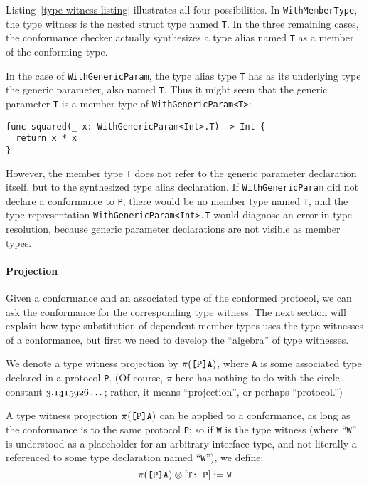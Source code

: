 \documentclass[../generics]{subfiles}
\begin{document}
\begin{example}
Listing~\ref{type witness listing} illustrates all four possibilities. In \texttt{WithMemberType}, the type witness is the nested struct type named \texttt{T}. In the three remaining cases, the conformance checker actually synthesizes a type alias named \texttt{T} as a member of the conforming type.

In the case of \texttt{WithGenericParam}, the type alias type \texttt{T} has as its underlying type the generic parameter, also named \texttt{T}. Thus it might seem that the generic parameter \texttt{T} is a member type of \texttt{WithGenericParam<T>}:
\begin{Verbatim}
func squared(_ x: WithGenericParam<Int>.T) -> Int {
  return x * x
}
\end{Verbatim}

However, the member type \texttt{T} does not refer to the generic parameter declaration itself, but to the synthesized type alias declaration. If \texttt{WithGenericParam} did not declare a conformance to \texttt{P}, there would be no member type named \texttt{T}, and the type representation \texttt{WithGenericParam<Int>.T} would diagnose an error in type resolution, because generic parameter declarations are not visible as member types.
\end{example}

\paragraph{Projection}
%
%
%
Given a conformance and an associated type of the conformed protocol, we can ask the conformance for the corresponding type witness. The next section will explain how type substitution of dependent member types uses the type witnesses of a conformance, but first we need to develop the ``algebra'' of type witnesses.

We denote a type witness projection by $\pi(\texttt{[P]A})$, where \texttt{A} is some associated type declared in a protocol \texttt{P}. (Of course, $\pi$ here has nothing to do with the circle constant $\oldstylenums{3.1415926}\ldots\,$; rather, it means ``projection'', or perhaps ``protocol.'')

A type witness projection $\pi(\texttt{[P]A})$ can be applied to a conformance, as long as the conformance is to the same protocol \texttt{P}; so if \texttt{W} is the type witness (where ``\texttt{W}'' is understood as a placeholder for an arbitrary interface type, and not literally a referenced to some type declaration named ``\texttt{W}''), we define:
\[\pi(\texttt{[P]A})\otimes[\texttt{T:~P}]:=\texttt{W}\]
\end{document}
